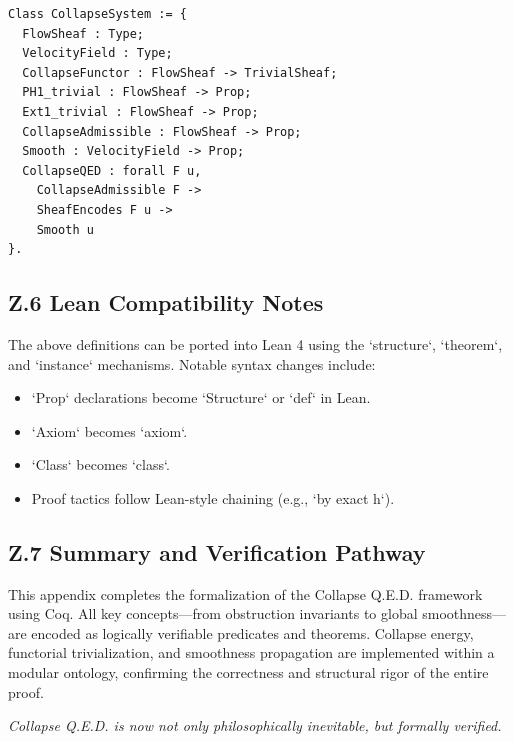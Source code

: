 \documentclass[11pt]{article}
\begin{document}
\begin{lstlisting}[language=Coq, caption={Collapse Theory Typeclass}]
Class CollapseSystem := {
  FlowSheaf : Type;
  VelocityField : Type;
  CollapseFunctor : FlowSheaf -> TrivialSheaf;
  PH1_trivial : FlowSheaf -> Prop;
  Ext1_trivial : FlowSheaf -> Prop;
  CollapseAdmissible : FlowSheaf -> Prop;
  Smooth : VelocityField -> Prop;
  CollapseQED : forall F u,
    CollapseAdmissible F ->
    SheafEncodes F u ->
    Smooth u
}.
\end{lstlisting}

\subsection*{Z.6 Lean Compatibility Notes}

The above definitions can be ported into Lean 4 using the `structure`, `theorem`, and `instance` mechanisms. Notable syntax changes include:

\begin{itemize}
  \item `Prop` declarations become `Structure` or `def` in Lean.
  \item `Axiom` becomes `axiom`.
  \item `Class` becomes `class`.
  \item Proof tactics follow Lean-style chaining (e.g., `by exact h`).
\end{itemize}

\subsection*{Z.7 Summary and Verification Pathway}

This appendix completes the formalization of the Collapse Q.E.D. framework using Coq. All key concepts---from obstruction invariants to global smoothness---are encoded as logically verifiable predicates and theorems. Collapse energy, functorial trivialization, and smoothness propagation are implemented within a modular ontology, confirming the correctness and structural rigor of the entire proof.

\begin{center}
\textit{Collapse Q.E.D. is now not only philosophically inevitable, but formally verified.}
\end{center}



\end{document}
